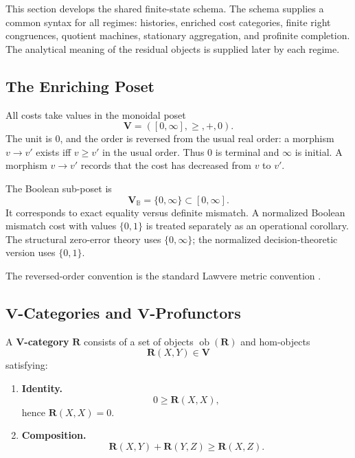 \documentclass[12pt]{article}
\theoremstyle{definition}
\begin{document}
This section develops the shared finite-state schema.  The schema supplies a
common syntax for all regimes: histories, enriched cost categories, finite
right congruences, quotient machines, stationary aggregation, and profinite
completion.  The analytical meaning of the residual objects is supplied later
by each regime.

\subsection{The Enriching Poset}
\label{subsec:enriching-poset}

All costs take values in the monoidal poset
\[
\mathbf V=([0,\infty],\ge,+,0).
\]
The unit is $0$, and the order is reversed from the usual real order: a
morphism $v\to v'$ exists iff $v\ge v'$ in the usual order.  Thus $0$ is
terminal and $\infty$ is initial.  A morphism $v\to v'$ records that the cost
has decreased from $v$ to $v'$.

The Boolean sub-poset is
\[
\mathbf V_{\mathbb B}=\{0,\infty\}\subset[0,\infty].
\]
It corresponds to exact equality versus definite mismatch.  A normalized
Boolean mismatch cost with values $\{0,1\}$ is treated separately as an
operational corollary.  The structural zero-error theory uses
$\{0,\infty\}$; the normalized decision-theoretic version uses $\{0,1\}$.

The reversed-order convention is the standard Lawvere metric convention
\cite{lawvere1973}.

\subsection{$\mathbf V$-Categories and $\mathbf V$-Profunctors}
\label{subsec:V-cats-profunctors}

A \textbf{$\mathbf V$-category} $\mathbf R$ consists of a set of objects
$\operatorname{ob}(\mathbf R)$ and hom-objects
\[
\mathbf R(X,Y)\in\mathbf V
\]
satisfying:
\begin{enumerate}[label=(\roman*),nosep]
\item \textbf{Identity.}
\[
0\ge \mathbf R(X,X),
\]
hence $\mathbf R(X,X)=0$.

\item \textbf{Composition.}
\[
\mathbf R(X,Y)+\mathbf R(Y,Z)\ge \mathbf R(X,Z).
\]
\end{enumerate}
\end{document}
